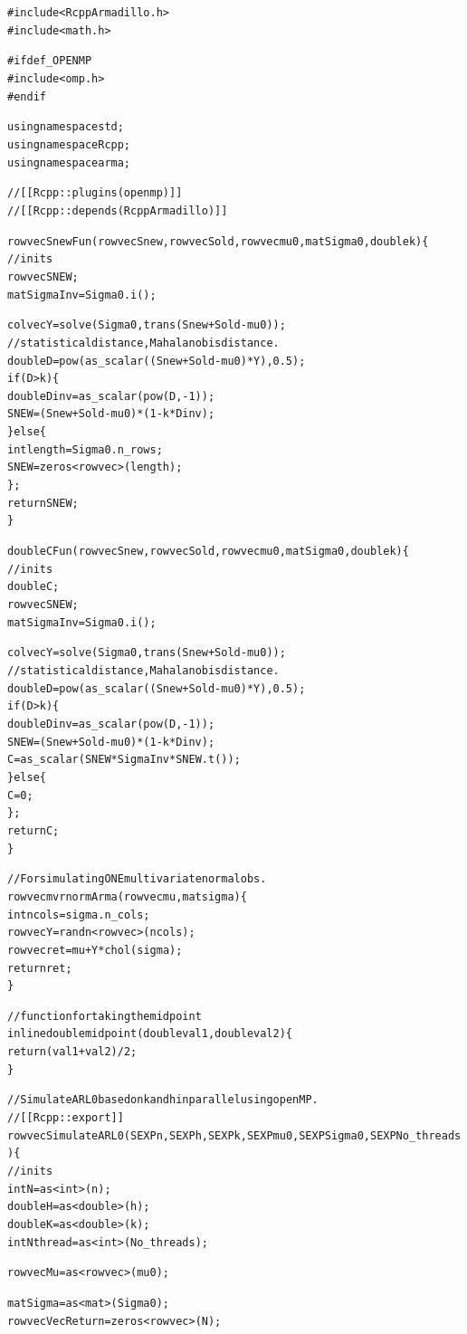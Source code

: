 \documentclass[a4paper,11pt,fleqn,twoside,notitlepage]{report}
\makeatletter
\newenvironment{kframe}{%
 \def\at@end@of@kframe{}%
 \ifinner\ifhmode%
  \def\at@end@of@kframe{\end{minipage}}%
  \begin{minipage}{\columnwidth}%
 \fi\fi%
 \def\FrameCommand##1{\hskip\@totalleftmargin \hskip-\fboxsep
 \colorbox{shadecolor}{##1}\hskip-\fboxsep
     \hskip-\linewidth \hskip-\@totalleftmargin \hskip\columnwidth}%
 \MakeFramed {\advance\hsize-\width
   \@totalleftmargin\z@ \linewidth\hsize
   \@setminipage}}%
 {\par\unskip\endMakeFramed%
 \at@end@of@kframe}
\newenvironment{knitrout}{}{} %
\makeatother
\begin{document}
\begin{knitrout}
\color{fgcolor}\begin{kframe}
\begin{alltt}
#include <RcppArmadillo.h>
#include <math.h>

#ifdef _OPENMP
#include <omp.h>
#endif

using namespace std;
using namespace Rcpp;
using namespace arma;


// [[Rcpp::plugins(openmp)]]
// [[Rcpp::depends(RcppArmadillo)]]

rowvec SnewFun(rowvec Snew, rowvec Sold, rowvec mu0, mat Sigma0, double k) \{
  //inits
  rowvec SNEW;
  mat SigmaInv = Sigma0.i();
  
  colvec Y = solve(Sigma0, trans(Snew+Sold-mu0));
  // statistical distance, Mahalanobis distance.
  double D = pow(as_scalar((Snew+Sold-mu0)*Y),0.5);
  if (D>k)\{
    double Dinv = as_scalar(pow(D,-1));
    SNEW = (Snew+Sold-mu0)*(1-k*Dinv);
  \}else\{
    int length = Sigma0.n_rows;
    SNEW = zeros<rowvec>(length);
  \};
  return SNEW;
\}

double CFun(rowvec Snew, rowvec Sold, rowvec mu0, mat Sigma0, double k)\{
  //inits
  double C;
  rowvec SNEW;
  mat SigmaInv = Sigma0.i();
  
  colvec Y = solve(Sigma0, trans(Snew+Sold-mu0));
  // statistical distance, Mahalanobis distance.
  double D = pow(as_scalar((Snew+Sold-mu0)*Y),0.5);
  if (D>k)\{
    double Dinv = as_scalar(pow(D,-1));
    SNEW = (Snew+Sold-mu0)*(1-k*Dinv);
    C = as_scalar(SNEW * SigmaInv * SNEW.t());
  \}else\{
    C = 0;
  \};
  return C;
\}

// For simulating ONE multivariate normal obs.
rowvec mvrnormArma(rowvec mu, mat sigma) \{
  int ncols = sigma.n_cols;
  rowvec Y = randn<rowvec>(ncols);
  rowvec ret = mu + Y * chol(sigma);
  return ret;
\}

// function for taking the midpoint
inline double midpoint(double val1, double val2) \{
  return (val1 + val2) / 2;
\}

// Simulate ARL0 based on k and h in parallel using open MP. 
// [[Rcpp::export]]
rowvec SimulateARL0(SEXP n, SEXP h, SEXP k, SEXP mu0, SEXP Sigma0, SEXP No_threads) \{
  // inits
  int N = as<int>(n);
  double H = as<double>(h);
  double K = as<double>(k);
  int Nthread = as<int>(No_threads);
  
  rowvec Mu = as<rowvec>(mu0);
  
  mat Sigma = as<mat>(Sigma0);
  rowvec VecReturn = zeros<rowvec>(N);
  

\end{alltt}
\end{kframe}
\end{knitrout}
\end{document}
